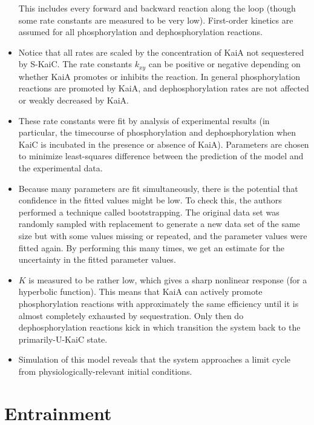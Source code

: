\documentclass{article}
\begin{document}
\begin{itemize}
This includes every forward and backward reaction along the loop (though some rate constants are measured to be very low). First-order kinetics are assumed for all phosphorylation and dephosphorylation reactions.

\item Notice that all rates are scaled by the concentration of KaiA not sequestered by S-KaiC. The rate constants $k_{xy}$ can be positive or negative depending on whether KaiA promotes or inhibits the reaction. In general phosphorylation reactions are promoted by KaiA, and dephosphorylation rates are not affected or weakly decreased by KaiA.

\item These rate constants were fit by analysis of experimental results (in particular, the timecourse of phosphorylation and dephosphorylation when KaiC is incubated in the presence or absence of KaiA). Parameters are chosen to minimize least-squares difference between the prediction of the model and the experimental data.

\item Because many parameters are fit simultaneously, there is the potential that confidence in the fitted values might be low. To check this, the authors performed a technique called bootstrapping. The original data set was randomly sampled with replacement to generate a new data set of the same size but with some values missing or repeated, and the parameter values were fitted again. By performing this many times, we get an estimate for the uncertainty in the fitted parameter values.

\item $K$ is measured to be rather low, which gives a sharp nonlinear response (for a hyperbolic function). This means that KaiA can actively promote phosphorylation reactions with approximately the same efficiency until it is almost completely exhausted by sequestration. Only then do dephosphorylation reactions kick in which transition the system back to the primarily-U-KaiC state.

\item Simulation of this model reveals that the system approaches a limit cycle from physiologically-relevant initial conditions.
\end{itemize}

\section*{Entrainment}
\end{document}
